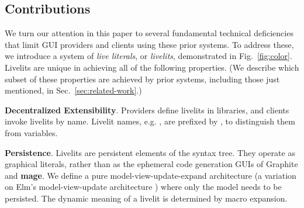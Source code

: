 \subsection{Contributions}
\label{sec:contributions}
We turn our attention in this paper to several fundamental technical
deficiencies that limit GUI providers and clients using these prior systems.
To address these, 
we introduce a system of \emph{live literals}, or \emph{livelits}, 
demonstrated in Fig.~\ref{fig:color}. 
Livelits are unique in achieving all of the following properties.
(We describe which subset of these properties 
are achieved by prior systems,
including those just mentioned, 
in Sec.~\ref{sec:related-work}.)

\newcommand{\llproperty}[1]{\vspace{5px}\noindent\textbf{#1}.}

\llproperty{Decentralized Extensibility}
    Providers define livelits in libraries, and 
    clients invoke livelits by name. Livelit names, e.g. ,  are prefixed by \li{\$},    
    to distinguish them from variables.
 
\llproperty{Persistence}
  Livelits are persistent elements of the syntax tree. They operate as  
  graphical literals, rather than as the ephemeral code generation GUIs of Graphite and \textbf{mage}. 
  We define a pure model-view-update-expand architecture
  (a variation on Elm's model-view-update architecture \cite{ElmArchitecture}) 
  where only the model needs to be persisted.
  The dynamic meaning of a livelit is determined by macro expansion.

